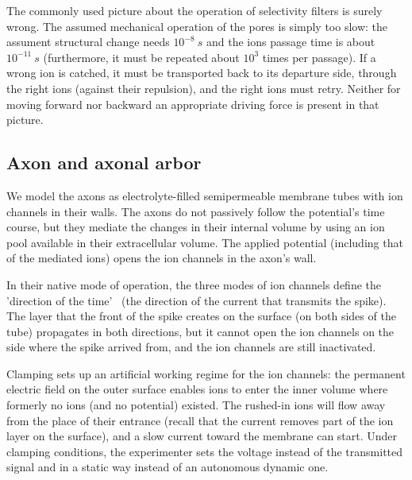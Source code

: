The commonly used picture about the operation of selectivity filters
is surely wrong. The assumed mechanical operation of the pores
is simply too slow: the assument structural change needs $10^{-8}\ s$
and the ions passage time is about $10^{-11}\ s$ (furthermore, it must be repeated about $10^{3}$ times per passage). If a wrong ion is catched,
it must be transported back to its departure side, through the right ions
(against their repulsion), and the right ions must retry.
Neither for moving forward nor backward an appropriate driving force is present in that picture.

\subsection{Axon and axonal arbor\label{sec:Physics-AxonalDelivery}}


We model the axons as electrolyte-filled semipermeable membrane tubes with ion channels in their walls. The axons do not passively follow the potential's time course, but they
mediate the changes in their internal volume by using an ion pool
available in their extracellular volume. The applied potential (including that of the mediated ions) opens the
ion channels in the axon's wall. 

In their native mode of operation, the three modes of ion channels define the 'direction of the time'~\cite{ThreeStateUnidirectional:2004, MarkovianIonChannel:2005,RoleOfInformationTransferSpeed:2022} (the direction of 
the current that transmits the spike). The layer that the 
front of the spike creates on the surface (on both sides
of the tube) propagates in both directions, 
but it cannot open the ion channels on the side where
the spike arrived from, and the ion channels are still
inactivated.


Clamping
sets up an artificial working regime for the ion channels: the permanent
electric field on the outer surface enables ions to enter the inner volume where
formerly no ions (and no potential) existed. The rushed-in ions will
flow away from the place of their entrance (recall that the current removes part of the ion layer on the surface), and a slow current toward the membrane can start. 
Under clamping conditions, the experimenter sets the voltage instead of the transmitted signal and in a static way instead of an  autonomous dynamic one.

